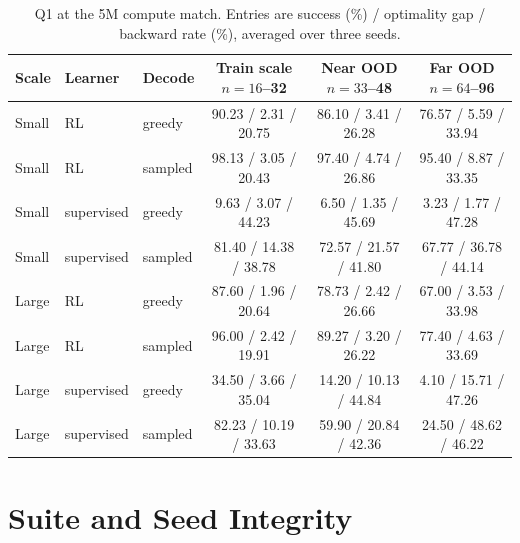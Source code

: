 \documentclass[10pt,twocolumn]{article}
\begin{document}
\begin{table}[t]
\centering
\caption{Q1 at the 5M compute match.  Entries are success (\%) / optimality
gap / backward rate (\%), averaged over three seeds.}
\label{tab:q1five}
\small
\setlength{\tabcolsep}{9pt}
\begin{tabular}{@{}lllccc@{}}
\toprule
Scale & Learner & Decode &
Train scale $n{=}16$--32 & Near OOD $n{=}33$--48 & Far OOD $n{=}64$--96\\
\midrule
Small & RL & greedy
 & 90.23 / 2.31 / 20.75 & 86.10 / 3.41 / 26.28 & 76.57 / 5.59 / 33.94\\
Small & RL & sampled
 & 98.13 / 3.05 / 20.43 & 97.40 / 4.74 / 26.86 & 95.40 / 8.87 / 33.35\\
Small & supervised & greedy
 & 9.63 / 3.07 / 44.23 & 6.50 / 1.35 / 45.69 & 3.23 / 1.77 / 47.28\\
Small & supervised & sampled
 & 81.40 / 14.38 / 38.78 & 72.57 / 21.57 / 41.80 & 67.77 / 36.78 / 44.14\\
\midrule
Large & RL & greedy
 & 87.60 / 1.96 / 20.64 & 78.73 / 2.42 / 26.66 & 67.00 / 3.53 / 33.98\\
Large & RL & sampled
 & 96.00 / 2.42 / 19.91 & 89.27 / 3.20 / 26.22 & 77.40 / 4.63 / 33.69\\
Large & supervised & greedy
 & 34.50 / 3.66 / 35.04 & 14.20 / 10.13 / 44.84 & 4.10 / 15.71 / 47.26\\
Large & supervised & sampled
 & 82.23 / 10.19 / 33.63 & 59.90 / 20.84 / 42.36 & 24.50 / 48.62 / 46.22\\
\bottomrule
\end{tabular}
\end{table}

\section{Suite and Seed Integrity}
\end{document}
